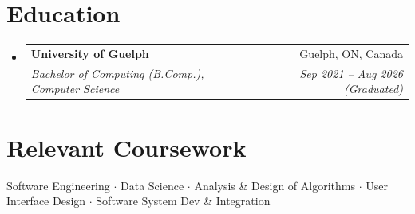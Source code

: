 \documentclass[letterpaper,11pt]{article}
\makeatletter
\newcommand{\resumeSubheading}[4]{
  \vspace{-1pt}\item
    \begin{tabular*}{0.97\textwidth}[t]{l@{\extracolsep{\fill}}r}
      \textbf{#1} & #2 \\
      \textit{\small#3} & \textit{\small #4} \\
    \end{tabular*}\vspace{-5pt}
}
\newcommand{\resumeSubHeadingListStart}{\begin{itemize}[leftmargin=*]}
\newcommand{\resumeSubHeadingListEnd}{\end{itemize}}
\makeatother
\begin{document}
\section{Education}
  \resumeSubHeadingListStart
    \resumeSubheading
      {University of Guelph}{Guelph, ON, Canada}
      {Bachelor of Computing (B.Comp.), Computer Science}{Sep 2021 -- Aug 2026 (Graduated)}
  \resumeSubHeadingListEnd

\section{Relevant Coursework}
  \vspace{2pt}
  \small{
    Software Engineering $\cdot$
    Data Science $\cdot$
    Analysis \& Design of Algorithms $\cdot$
    User Interface Design $\cdot$
    Software System Dev \& Integration
  }

\end{document}
